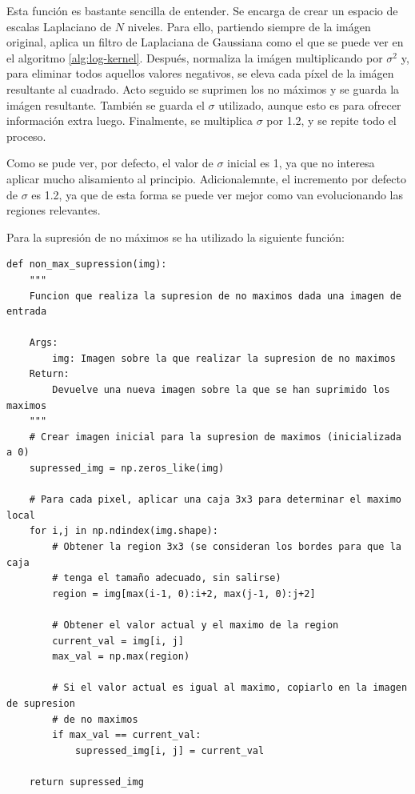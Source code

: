 \documentclass[11pt,a4paper]{article}
\begin{document}
Esta función es bastante sencilla de entender. Se encarga de crear un espacio de escalas Laplaciano de $N$ niveles.
Para ello, partiendo siempre de la imágen original, aplica un filtro de Laplaciana de Gaussiana como el que se puede
ver en el algoritmo \ref{alg:log-kernel}. Después, normaliza la imágen multiplicando por $\sigma^2$ y, para eliminar
todos aquellos valores negativos, se eleva cada píxel de la imágen resultante al cuadrado. Acto seguido se suprimen
los no máximos y se guarda la imágen resultante. También se guarda el $\sigma$ utilizado, aunque esto es para ofrecer
información extra luego. Finalmente, se multiplica $\sigma$ por 1.2, y se repite todo el proceso.

Como se pude ver, por defecto, el valor de $\sigma$ inicial es 1, ya que no interesa aplicar mucho alisamiento al principio.
Adicionalemnte, el incremento por defecto de $\sigma$ es 1.2, ya que de esta forma se puede ver mejor como van evolucionando
las regiones relevantes.

Para la supresión de no máximos se ha utilizado la siguiente función:

\begin{lstlisting}[caption={Función que hace la supresión de no máximos.},label={alg:non-max-supression}]
def non_max_supression(img):
    """
    Funcion que realiza la supresion de no maximos dada una imagen de entrada

    Args:
        img: Imagen sobre la que realizar la supresion de no maximos
    Return:
        Devuelve una nueva imagen sobre la que se han suprimido los maximos
    """
    # Crear imagen inicial para la supresion de maximos (inicializada a 0)
    supressed_img = np.zeros_like(img)

    # Para cada pixel, aplicar una caja 3x3 para determinar el maximo local
    for i,j in np.ndindex(img.shape):
        # Obtener la region 3x3 (se consideran los bordes para que la caja
        # tenga el tamaño adecuado, sin salirse)
        region = img[max(i-1, 0):i+2, max(j-1, 0):j+2]

        # Obtener el valor actual y el maximo de la region
        current_val = img[i, j]
        max_val = np.max(region)

        # Si el valor actual es igual al maximo, copiarlo en la imagen de supresion
        # de no maximos
        if max_val == current_val:
            supressed_img[i, j] = current_val

    return supressed_img
\end{lstlisting}
\end{document}
